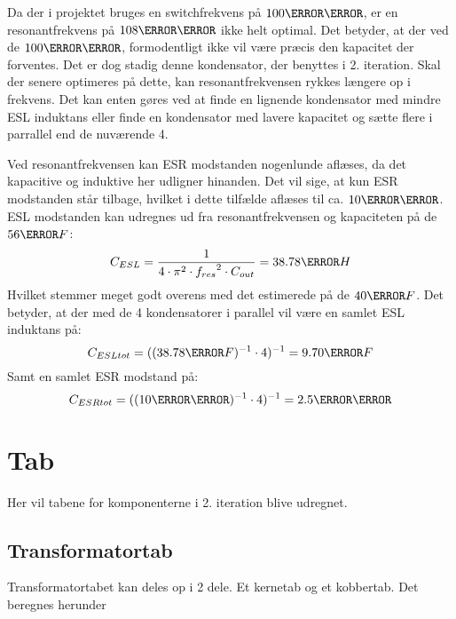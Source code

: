 \noindent Da der i projektet bruges en switchfrekvens på $100\kilo \hertz$, er en resonantfrekvens på $108\kilo \hertz$ ikke helt optimal. Det betyder, at der ved de $100\kilo \hertz$, formodentligt ikke vil være præcis den kapacitet der forventes. Det er dog stadig denne kondensator, der benyttes i 2. iteration. Skal der senere optimeres på dette, kan resonantfrekvensen rykkes længere op i frekvens. Det kan enten gøres ved at finde en lignende kondensator med mindre ESL induktans eller finde en kondensator med lavere kapacitet og sætte flere i parrallel end de nuværende 4.


\noindent Ved resonantfrekvensen kan ESR modstanden nogenlunde aflæses, da det kapacitive og induktive her udligner hinanden. Det vil sige, at kun ESR modstanden står tilbage, hvilket i dette tilfælde aflæses til ca. $10\milli \ohm$. 
ESL modstanden kan udregnes ud fra resonantfrekvensen og kapaciteten på de $56\micro F$:
\begin{equation} \label{CESL}
C_{ESL} = \frac{1}{4 \cdot \pi^{2} \cdot {f_{res}}^{2} \cdot C_{out}} = 38.78\nano H
\end{equation}
Hvilket stemmer meget godt overens med det estimerede på de $40\nano F$.
Det betyder, at der med de 4 kondensatorer i parallel vil være en samlet ESL induktans på: 
\begin{equation} \label{CESLtot}
C_{ESLtot} = ((38.78\nano F)^{-1} \cdot 4)^{-1} = 9.70\nano F
\end{equation}
Samt en samlet ESR modstand på:
\begin{equation} \label{CSRtot}
C_{ESRtot} = ((10\milli \ohm)^{-1} \cdot 4)^{-1} = 2.5\milli \ohm
\end{equation}



\section{Tab}
Her vil tabene for komponenterne i 2. iteration blive udregnet. 

\subsection{Transformatortab}
Transformatortabet kan deles op i 2 dele. Et kernetab og et kobbertab. Det beregnes herunder

